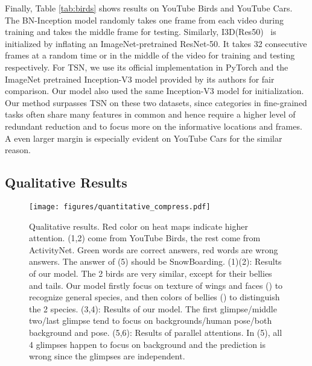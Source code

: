 \documentclass[runningheads]{llncs}
\begin{document}
Finally, Table \ref{tab:birds} shows results on YouTube Birds and YouTube Cars. The BN-Inception model randomly takes one frame from each video during training and takes the middle frame for testing. Similarly, I3D(Res50)~\cite{carreira2017quo} is initialized by inflating an ImageNet-pretrained ResNet-50. It takes 32 consecutive frames at a random time or in the middle of the video for training and testing respectively. For TSN, we use its official implementation in PyTorch and the ImageNet pretrained Inception-V3 model provided by its authors for fair comparison. Our model also used the same Inception-V3 model for initialization. Our method surpasses TSN on these two datasets, since categories in fine-grained tasks often share many features in common and hence require a higher level of redundant reduction and to focus more on the informative locations and frames. A even larger margin is especially evident on YouTube Cars for the similar reason. 

\subsection{Qualitative Results}
\begin{figure*}[htbp]
\centering
\texttt{[image: figures/quantitative\_compress.pdf]}
\caption{
\label{fig:quantitative}
Qualitative results. Red color on heat maps indicate higher attention. (1,2) come from YouTube Birds, the rest come from ActivityNet. Green words are correct answers, red words are wrong answers. The answer of (5) should be SnowBoarding. (1)(2): Results of our model. The 2 birds are very similar, except for their bellies and tails. Our model firstly focus on texture of wings and faces () to recognize general species, and then colors of bellies () to distinguish the 2 species. (3,4): Results of our model. The first glimpse/middle two/last glimpse tend to focus on backgrounds/human pose/both background and pose. (5,6): Results of parallel attentions. In (5), all 4 glimpses happen to focus on background and the prediction is wrong since the glimpses are independent.}
\end{figure*}
\end{document}
